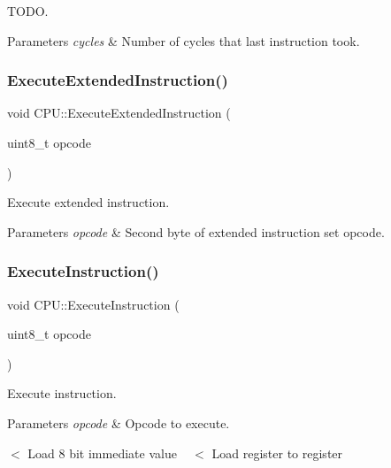 T\+O\+DO. 


\begin{DoxyParams}{Parameters}
{\em cycles} & Number of cycles that last instruction took. \\
\hline
\end{DoxyParams}
\mbox{\label{classCPU_ac2cebcf2ac957a884175b94ff5f62c15}} 
\subsubsection{\texorpdfstring{Execute\+Extended\+Instruction()}{ExecuteExtendedInstruction()}}
{\footnotesize\ttfamily void C\+P\+U\+::\+Execute\+Extended\+Instruction (\begin{DoxyParamCaption}\item[{uint8\+\_\+t}]{opcode }\end{DoxyParamCaption})}



Execute extended instruction. 


\begin{DoxyParams}{Parameters}
{\em opcode} & Second byte of extended instruction set opcode. \\
\hline
\end{DoxyParams}
\mbox{\label{classCPU_ad8e103aaedd1c250d33f9cc373f2f16b}} 
\subsubsection{\texorpdfstring{Execute\+Instruction()}{ExecuteInstruction()}}
{\footnotesize\ttfamily void C\+P\+U\+::\+Execute\+Instruction (\begin{DoxyParamCaption}\item[{uint8\+\_\+t}]{opcode }\end{DoxyParamCaption})}



Execute instruction. 


\begin{DoxyParams}{Parameters}
{\em opcode} & Opcode to execute. \\
\hline
\end{DoxyParams}
$<$ Load 8 bit immediate value ~\newline
 $<$ Load register to register \mbox{\label{classCPU_a852335312c1040d2fcde2a690443d425}} 
